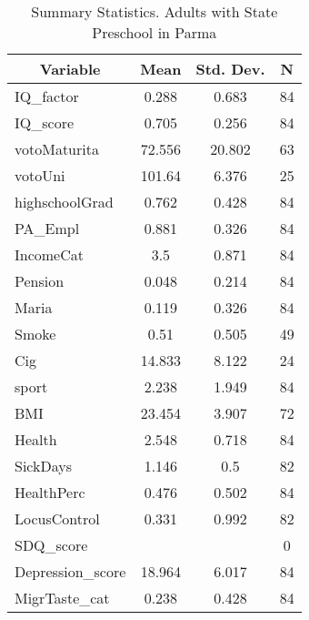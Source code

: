 
\begin{table}[htbp]\centering \caption{Summary Statistics. Adults with State Preschool in Parma \label{bothAdultmaternaStatParma}}
\begin{tabular}{l c c  c}\hline\hline
\multicolumn{1}{c}{\textbf{Variable}} & \textbf{Mean}
 & \textbf{Std. Dev.} & \textbf{N}\\ \hline
IQ\_factor & 0.288 & 0.683  & 84\\
IQ\_score & 0.705 & 0.256  & 84\\
votoMaturita & 72.556 & 20.802  & 63\\
votoUni & 101.64 & 6.376  & 25\\
highschoolGrad & 0.762 & 0.428  & 84\\
PA\_Empl & 0.881 & 0.326  & 84\\
IncomeCat & 3.5 & 0.871  & 84\\
Pension & 0.048 & 0.214  & 84\\
Maria & 0.119 & 0.326  & 84\\
Smoke & 0.51 & 0.505  & 49\\
Cig & 14.833 & 8.122  & 24\\
sport & 2.238 & 1.949  & 84\\
BMI & 23.454 & 3.907  & 72\\
Health & 2.548 & 0.718  & 84\\
SickDays & 1.146 & 0.5  & 82\\
HealthPerc & 0.476 & 0.502  & 84\\
LocusControl & 0.331 & 0.992  & 82\\
SDQ\_score &  &   & 0\\
Depression\_score & 18.964 & 6.017  & 84\\
MigrTaste\_cat & 0.238 & 0.428  & 84\\
\hline\end{tabular}
\end{table}
